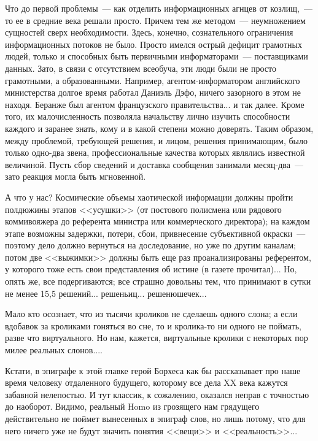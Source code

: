 \documentclass{scrbook}
\newcommand{\flqq}{<<}
\newcommand{\frqq}{>>}
\newcommand{\mdash}{~--- }
\newcommand{\commamdash}{~--- } %
\begin{document}
Что до первой проблемы{\mdash}как отделить информационных агнцев от козлищ,{\commamdash}то ее в средние века решали просто. Причем тем же методом{\mdash}неумножением сущностей сверх необходимости. Здесь, конечно, сознательного ограничения информационных потоков не было. Просто имелся острый дефицит грамотных людей, только и способных быть первичными информаторами{\mdash}поставщиками данных. Зато, в связи с отсутствием всеобуча, эти люди были не просто грамотными, а образованными. Например, агентом-информатором английского министерства долгое время работал Даниэль Дэфо, ничего зазорного в этом не находя. Беранже был агентом французского правительства... и так далее. Кроме того, их малочисленность позволяла начальству лично изучить способности каждого и заранее знать, кому и в какой степени можно доверять. Таким образом, между проблемой, требующей решения, и лицом, решения принимающим, было только одно-два звена, профессиональные качества которых являлись известной величиной. Пусть сбор сведений и доставка сообщения занимали месяц-два{\mdash}зато реакция могла быть мгновенной.

А что у нас? Космические объемы хаотической информации должны пройти полдюжины этапов {\flqq}усушки{\frqq} (от постового полисмена или рядового коммивояжера до референта министра или коммерческого директора); на каждом этапе возможны задержки, потери, сбои, привнесение субъективной окраски{\mdash}поэтому дело должно вернуться на доследование, но уже по другим каналам; потом две {\flqq}выжимки{\frqq} должны быть еще раз проанализированы референтом, у которого тоже есть свои представления об истине (в газете прочитал)... Но, опять же, все подергиваются; все страшно довольны тем, что принимают в сутки не менее 15,5 решений... решеньиц... решенюшечек...

Мало кто осознает, что из тысячи кроликов не сделаешь одного слона; а если вдобавок за кроликами гоняться во сне, то и кролика-то ни одного не поймать, разве что виртуального. Но нам, кажется, виртуальные кролики с некоторых пор милее реальных слонов....

Кстати, в эпиграфе к этой главке герой Борхеса как бы рассказывает про наше время человеку отдаленного будущего, которому все дела XX века кажутся забавной нелепостью. И тут классик, к сожалению, оказался неправ с точностью до наоборот. Видимо, реальный Homo из грозящего нам грядущего действительно не поймет вынесенных в эпиграф слов, но лишь потому, что для него ничего уже не будут значить понятия {\flqq}вещи{\frqq} и {\flqq}реальность{\frqq}...
\end{document}
